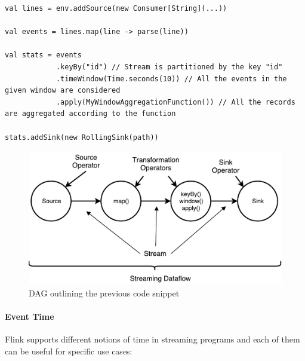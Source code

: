 \begin{code}

\begin{verbatim}
val lines = env.addSource(new Consumer[String](...))

val events = lines.map(line -> parse(line))

val stats = events
            .keyBy("id") // Stream is partitioned by the key "id" 
            .timeWindow(Time.seconds(10)) // All the events in the given window are considered 
            .apply(MyWindowAggregationFunction()) // All the records are aggregated according to the function      

stats.addSink(new RollingSink(path))
\end{verbatim}

\end{code}

\begin{figure}[h]
	\centering
	\includegraphics[scale=0.75]{Figures/dataflow.pdf}
	\decoRule
	\caption[Streaming Dataflow]{DAG outlining the previous code snippet}
	\label{fig:Dataflow}
\end{figure}

\paragraph{Event Time}

Flink supports different notions of time in streaming programs and each of them can be useful for specific use cases:

